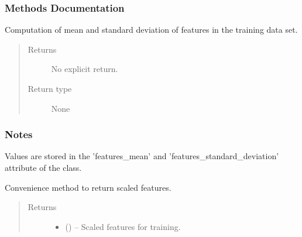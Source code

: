 \documentclass[a4paper,10pt,english]{sphinxmanual}
\begin{document}
\begin{fulllineitems}
\subsubsection*{Methods Documentation}

\begin{fulllineitems}
\label{\detokenize{api/ucf.TrainingDataSets:ucf.TrainingDataSets.compute_mean_and_standard_deviation}}
Computation of mean and standard deviation of features
in the training data set.
\begin{quote}\begin{description}
\item[{Returns}] \leavevmode
No explicit return.

\item[{Return type}] \leavevmode
None

\end{description}\end{quote}
\subsubsection*{Notes}

Values are stored in the 'features\_mean' and
'features\_standard\_deviation' attribute of the class.

\end{fulllineitems}


\begin{fulllineitems}
\label{\detokenize{api/ucf.TrainingDataSets:ucf.TrainingDataSets.get_scaled_features}}
Convenience method to return scaled features.
\begin{quote}\begin{description}
\item[{Returns}] \leavevmode
\begin{itemize}
\item {} 
 () -- Scaled features for training.


\end{itemize}
\end{description}
\end{quote}
\end{fulllineitems}
\end{fulllineitems}
\end{document}
